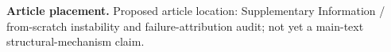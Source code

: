 \textbf{Article placement.} Proposed article location: Supplementary Information / from-scratch instability and failure-attribution audit; not yet a main-text structural-mechanism claim.
